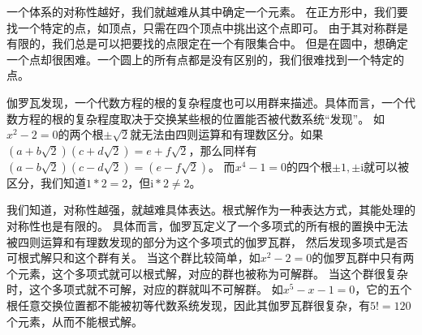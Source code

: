 \documentclass[main]{subfiles}
\begin{document}
一个体系的对称性越好，我们就越难从其中确定一个元素。
在正方形中，我们要找一个特定的点，如顶点，只需在四个顶点中挑出这个点即可。
由于其对称群是有限的，我们总是可以把要找的点限定在一个有限集合中。
但是在圆中，想确定一个点却很困难。一个圆上的所有点都是没有区别的，我们很难找到一个特定的点。

伽罗瓦发现，一个代数方程的根的复杂程度也可以用群来描述。具体而言，一个代数方程的根的复杂程度取决于交换某些根的位置能否被代数系统``发现''。
如\(x^2-2=0\)的两个根\(\pm \sqrt{2}\)就无法由四则运算和有理数区分。如果\((a+b \sqrt{2})(c+d \sqrt{2})=e+f \sqrt{2}\)，那么同样有\((a-b \sqrt{2})(c-d \sqrt{2})=(e-f \sqrt{2})\)。
而\(x^4-1=0\)的四个根\(\pm 1,\pm \mathrm{i}\)就可以被区分，我们知道\(1*2=2\)，但\(\mathrm{i}*2 \neq 2\)。

我们知道，对称性越强，就越难具体表达。根式解作为一种表达方式，其能处理的对称性也是有限的。
具体而言，伽罗瓦定义了一个多项式的所有根的置换中无法被四则运算和有理数发现的部分为这个多项式的伽罗瓦群，
然后发现多项式是否可根式解只和这个群有关。
当这个群比较简单，如\(x^2-2=0\)的伽罗瓦群中只有两个元素，这个多项式就可以根式解，对应的群也被称为可解群。
当这个群很复杂时，这个多项式就不可解，对应的群就叫不可解群。
如\(x^5-x-1=0\)，它的五个根任意交换位置都不能被初等代数系统发现，因此其伽罗瓦群很复杂，有\(5!=120\)个元素，从而不能根式解。
\end{document}
